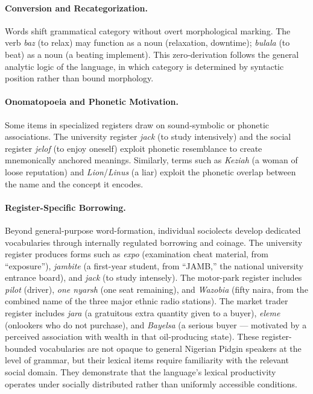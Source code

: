 \documentclass[12pt]{article}
\begin{document}
\paragraph{Conversion and Recategorization.}
Words shift grammatical category without overt morphological marking. The verb \textit{baz} (to relax) may function as a noun (relaxation, downtime); \textit{bulala} (to beat) as a noun (a beating implement). This zero-derivation follows the general analytic logic of the language, in which category is determined by syntactic position rather than bound morphology.

\paragraph{Onomatopoeia and Phonetic Motivation.}
Some items in specialized registers draw on sound-symbolic or phonetic associations. The university register \textit{jack} (to study intensively) and the social register \textit{jelof} (to enjoy oneself) exploit phonetic resemblance to create mnemonically anchored meanings. Similarly, terms such as \textit{Keziah} (a woman of loose reputation) and \textit{Lion}/\textit{Linus} (a liar) exploit the phonetic overlap between the name and the concept it encodes.

\paragraph{Register-Specific Borrowing.}
Beyond general-purpose word-formation, individual sociolects develop dedicated vocabularies through internally regulated borrowing and coinage. The university register produces forms such as \textit{expo} (examination cheat material, from ``exposure''), \textit{jambite} (a first-year student, from ``JAMB,'' the national university entrance board), and \textit{jack} (to study intensely). The motor-park register includes \textit{pilot} (driver), \textit{one nyarsh} (one seat remaining), and \textit{Wazobia} (fifty naira, from the combined name of the three major ethnic radio stations). The market trader register includes \textit{jara} (a gratuitous extra quantity given to a buyer), \textit{eleme} (onlookers who do not purchase), and \textit{Bayelsa} (a serious buyer --- motivated by a perceived association with wealth in that oil-producing state). These register-bounded vocabularies are not opaque to general Nigerian Pidgin speakers at the level of grammar, but their lexical items require familiarity with the relevant social domain. They demonstrate that the language's lexical productivity operates under socially distributed rather than uniformly accessible conditions.
\end{document}
